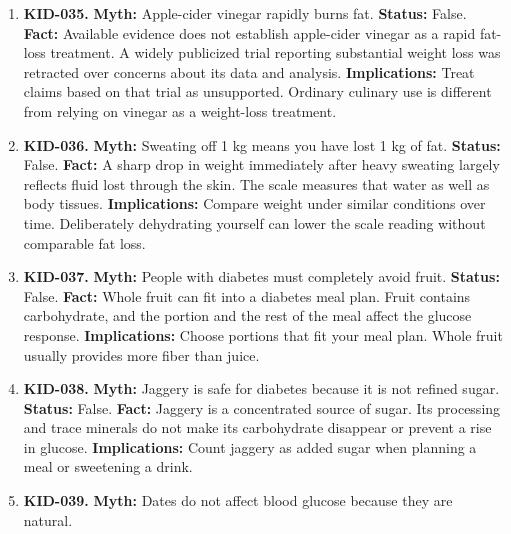 \documentclass[11pt,oneside]{book}
\begin{document}
\begin{enumerate}[leftmargin=0pt,labelwidth=0pt,labelsep=0pt,itemindent=0pt]
\item[] \textbf{KID-035.} \textbf{Myth:} Apple-cider vinegar rapidly burns fat.\newline
\textbf{Status:} False.\newline
\textbf{Fact:} Available evidence does not establish apple-cider vinegar as a rapid fat-loss treatment. A widely publicized trial reporting substantial weight loss was retracted over concerns about its data and analysis. \cite{ref356}\newline
\textbf{Implications:} Treat claims based on that trial as unsupported. Ordinary culinary use is different from relying on vinegar as a weight-loss treatment.
\item[] \textbf{KID-036.} \textbf{Myth:} Sweating off 1 kg means you have lost 1 kg of fat.\newline
\textbf{Status:} False.\newline
\textbf{Fact:} A sharp drop in weight immediately after heavy sweating largely reflects fluid lost through the skin. The scale measures that water as well as body tissues. \cite{ref292}\newline
\textbf{Implications:} Compare weight under similar conditions over time. Deliberately dehydrating yourself can lower the scale reading without comparable fat loss.
\item[] \textbf{KID-037.} \textbf{Myth:} People with diabetes must completely avoid fruit.\newline
\textbf{Status:} False.\newline
\textbf{Fact:} Whole fruit can fit into a diabetes meal plan. Fruit contains carbohydrate, and the portion and the rest of the meal affect the glucose response. \cite{ref357}\newline
\textbf{Implications:} Choose portions that fit your meal plan. Whole fruit usually provides more fiber than juice.
\item[] \textbf{KID-038.} \textbf{Myth:} Jaggery is safe for diabetes because it is not refined sugar.\newline
\textbf{Status:} False.\newline
\textbf{Fact:} Jaggery is a concentrated source of sugar. Its processing and trace minerals do not make its carbohydrate disappear or prevent a rise in glucose. \cite{ref357}\newline
\textbf{Implications:} Count jaggery as added sugar when planning a meal or sweetening a drink.
\item[] \textbf{KID-039.} \textbf{Myth:} Dates do not affect blood glucose because they are natural.\newline

\end{enumerate}
\end{document}
